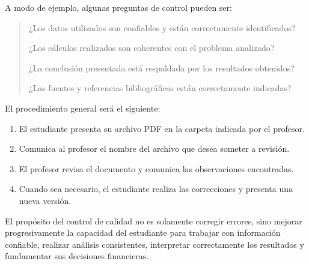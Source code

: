 \documentclass[12pt,a4paper]{article}
\begin{document}
A modo de ejemplo, algunas preguntas de control pueden ser:

\begin{quote}
¿Los datos utilizados son confiables y están correctamente identificados?

¿Los cálculos realizados son coherentes con el problema analizado?

¿La conclusión presentada está respaldada por los resultados obtenidos?

¿Las fuentes y referencias bibliográficas están correctamente indicadas?
\end{quote}

El procedimiento general será el siguiente:

\begin{enumerate}
    \item El estudiante presenta su archivo PDF en la carpeta indicada por el profesor.
    \item Comunica al profesor el nombre del archivo que desea someter a revisión.
    \item El profesor revisa el documento y comunica las observaciones encontradas.
    \item Cuando sea necesario, el estudiante realiza las correcciones y presenta una nueva versión.
\end{enumerate}

El propósito del control de calidad no es solamente corregir errores,
sino mejorar progresivamente la capacidad del estudiante para trabajar
con información confiable, realizar análisis consistentes, interpretar
correctamente los resultados y fundamentar sus decisiones financieras.\parencite{armoa2026conceptos,armoa2026ejercicios}

\printbibliography[title={Bibliografía}]
\end{document}
